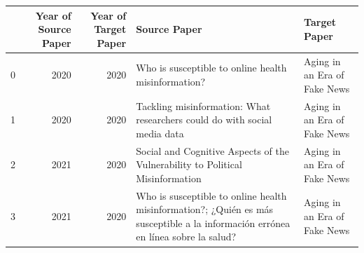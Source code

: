 \begin{tabular}{lrrll}
\toprule
 & Year of Source Paper & Year of Target Paper & Source Paper & Target Paper \\
\midrule
0 & 2020 & 2020 & Who is susceptible to online health misinformation? & Aging in an Era of Fake News \\
1 & 2020 & 2020 & Tackling misinformation: What researchers could do with social media data & Aging in an Era of Fake News \\
2 & 2021 & 2020 & Social and Cognitive Aspects of the Vulnerability to Political Misinformation & Aging in an Era of Fake News \\
3 & 2021 & 2020 & Who is susceptible to online health misinformation?; ¿Quién es más susceptible a la información errónea en línea sobre la salud? & Aging in an Era of Fake News \\
\bottomrule
\end{tabular}
